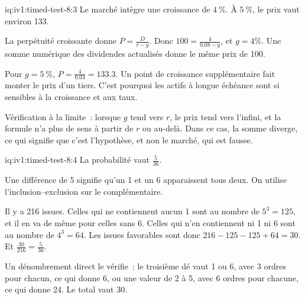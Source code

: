 \begin{solution}{iq:iv1:timed-test-8:3}
Le marché intègre une croissance de $4~\%$. À $5~\%$, le prix vaut environ 133.

La perpétuité croissante donne $P = \frac{D}{r - g}$. Donc $100 = \frac{4}{0.08 - g}$, et $g = 4\%$. Une somme numérique des dividendes actualisés donne le même prix de 100.

Pour $g = 5~\%$, $P = \frac{4}{0.03} = 133.3$. Un point de croissance supplémentaire fait monter le prix d'un tiers. C'est pourquoi les actifs à longue échéance sont si sensibles à la croissance et aux taux.

Vérification à la limite~: lorsque $g$ tend vers $r$, le prix tend vers l'infini, et la formule n'a plus de sens à partir de $r$ ou au-delà. Dans ce cas, la somme diverge, ce qui signifie que c'est l'hypothèse, et non le marché, qui est fausse.

\end{solution}

\begin{solution}{iq:iv1:timed-test-8:4}
La probabilité vaut $\frac{5}{36}$.

Une différence de 5 signifie qu'un 1 et un 6 apparaissent tous deux. On utilise l'inclusion--exclusion sur le complémentaire.

Il y a 216 issues. Celles qui ne contiennent aucun 1 sont au nombre de $5^3 = 125$, et il en va de même pour celles sans 6. Celles qui n'en contiennent ni 1 ni 6 sont au nombre de $4^3 = 64$. Les issues favorables sont donc $216 - 125 - 125 + 64 = 30$. Et $\frac{30}{216} = \frac{5}{36}$.

Un dénombrement direct le vérifie~: le troisième dé vaut 1 ou 6, avec 3 ordres pour chacun, ce qui donne 6, ou une valeur de 2 à 5, avec 6 ordres pour chacune, ce qui donne 24. Le total vaut 30.

\end{solution}

